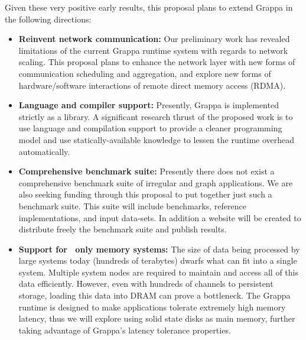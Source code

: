 
Given these very positive early results, this proposal plans to extend Grappa
in the following directions:

\begin{itemize}

\item \textbf{Reinvent network communication:} Our preliminary work has
revealed limitations of the current Grappa runtime system with regards to
network scaling. This proposal plans to enhance the network layer with new
forms of communication scheduling and aggregation, and explore new forms of
hardware/software interactions of remote direct memory access (RDMA).

\item \textbf{Language and compiler support:} Presently, Grappa is implemented
strictly as a library.  A significant research thrust of the proposed work is to use
language and compilation support to provide a cleaner programming model and use
statically-available knowledge to lessen the runtime overhead automatically.

\item \textbf{Comprehensive benchmark suite:} Presently there does not exist a
comprehensive benchmark suite of irregular and graph applications. We
are also seeking funding through this proposal to put together just
such a benchmark suite. This suite will include benchmarks, reference
implementations, and input data-sets. In addition a website will be
created to distribute freely the benchmark suite and publish results.

\item \textbf{Support for \ssd\ only memory systems:} The size of data being
processed by large systems today (hundreds of terabytes) dwarfs what can fit
into a single system. Multiple system nodes are required to maintain and
access all of this data efficiently. However, even with hundreds of channels
to persistent storage, loading this data into DRAM can prove a bottleneck. The
Grappa runtime is designed to make applications tolerate extremely high memory
latency, thus we will explore using solid state disks as main memory, 
further taking advantage of Grappa's latency tolerance properties.


\end{itemize}

